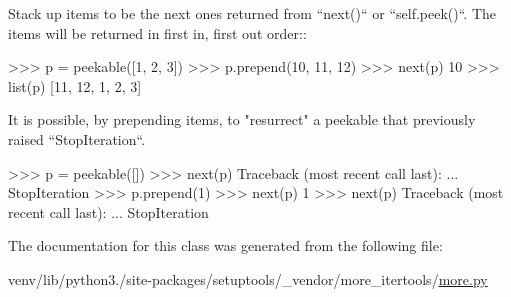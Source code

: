 \begin{DoxyVerb}Stack up items to be the next ones returned from ``next()`` or
``self.peek()``. The items will be returned in
first in, first out order::

    >>> p = peekable([1, 2, 3])
    >>> p.prepend(10, 11, 12)
    >>> next(p)
    10
    >>> list(p)
    [11, 12, 1, 2, 3]

It is possible, by prepending items, to "resurrect" a peekable that
previously raised ``StopIteration``.

    >>> p = peekable([])
    >>> next(p)
    Traceback (most recent call last):
      ...
    StopIteration
    >>> p.prepend(1)
    >>> next(p)
    1
    >>> next(p)
    Traceback (most recent call last):
      ...
    StopIteration\end{DoxyVerb}
 

The documentation for this class was generated from the following file\+:\begin{DoxyCompactItemize}
\item 
venv/lib/python3./site-\/packages/setuptools/\+\_\+vendor/more\+\_\+itertools/\hyperlink{more_8py}{more.\+py}\end{DoxyCompactItemize}
